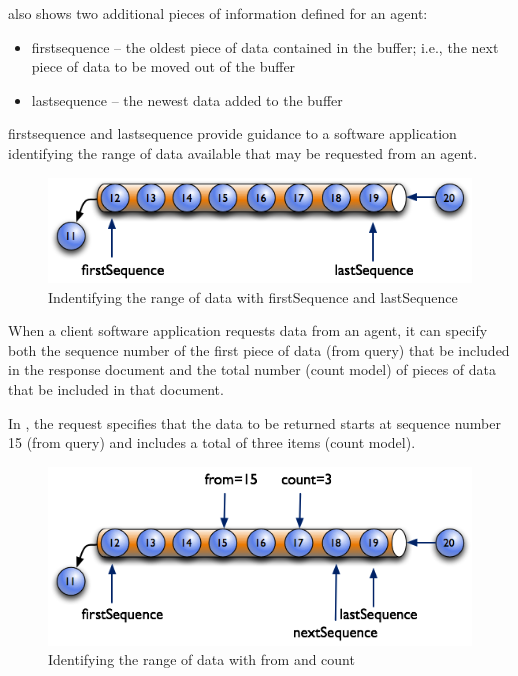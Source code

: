 \FloatBarrier


 also shows two additional pieces of information defined for an \gls{agent}:

\begin{itemize}
\item \gls{firstsequence} -- the oldest piece of data contained in the \gls{buffer}; i.e., the next piece of data to be moved out of the \gls{buffer}

\item \gls{lastsequence} -- the newest data added to the \gls{buffer}
\end{itemize}

\gls{firstsequence} and \gls{lastsequence} provide guidance to a software application identifying the range of data available that may be requested from an \gls{agent}. 

\begin{figure}[ht]
  \centering
  \includegraphics[width=1.0\textwidth]{figures/identifying-the-range-of-data-with-firstsequence-and-lastsequence.png}
  \caption{Indentifying the range of data with firstSequence and lastSequence}
  \label{fig:identifying-the-range-of-data-with-firstsequence-and-lastsequence}
\end{figure}

\FloatBarrier

When a client software application requests data from an \gls{agent}, it can specify both the \gls{sequence number} of the first piece of data (\gls{from query}) that \MUST be included in the \gls{response document} and the total number (\gls{count model}) of pieces of data that \SHOULD be included in that document.

In , the request specifies that the data to be returned starts at \gls{sequence number} 15 (\gls{from query}) and includes a total of three items (\gls{count model}).  

\begin{figure}[ht]
  \centering
  \includegraphics[width=1.0\textwidth]{figures/identifying-the-range-of-data-with-from-and-count.png}
  \caption{Identifying the range of data with from and count}
  \label{fig:identifying-the-range-of-data-with-from-and-count}
\end{figure}

